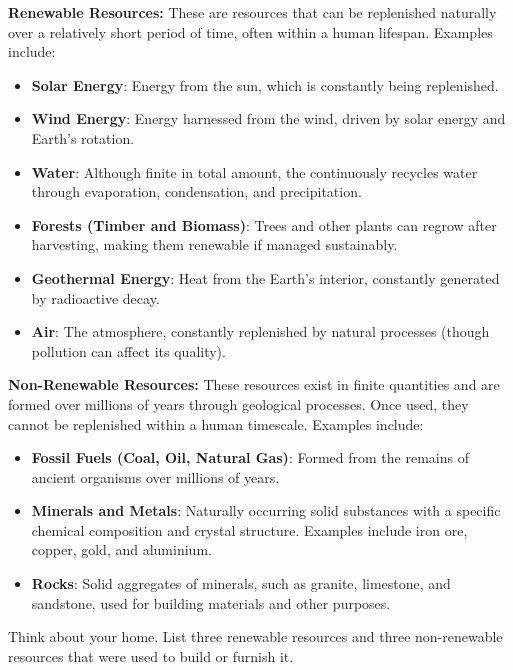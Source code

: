 \textbf{Renewable Resources:} These are resources that can be replenished naturally over a relatively short period of time, often within a human lifespan. Examples include:

\begin{itemize}
    \item \textbf{Solar Energy}:  Energy from the sun, which is constantly being replenished.
    \item \textbf{Wind Energy}:  Energy harnessed from the wind, driven by solar energy and Earth's rotation.
    \item \textbf{Water}:  Although finite in total amount, the  continuously recycles water through evaporation, condensation, and precipitation.
    \item \textbf{Forests (Timber and Biomass)}: Trees and other plants can regrow after harvesting, making them renewable if managed sustainably.
    \item \textbf{Geothermal Energy}: Heat from the Earth's interior, constantly generated by radioactive decay.
    \item \textbf{Air}: The atmosphere, constantly replenished by natural processes (though pollution can affect its quality).
\end{itemize}

\textbf{Non-Renewable Resources:} These resources exist in finite quantities and are formed over millions of years through geological processes. Once used, they cannot be replenished within a human timescale. Examples include:

\begin{itemize}
    \item \textbf{Fossil Fuels (Coal, Oil, Natural Gas)}: Formed from the remains of ancient organisms over millions of years.
    \item \textbf{Minerals and Metals}:  Naturally occurring solid substances with a specific chemical composition and crystal structure. Examples include iron ore, copper, gold, and aluminium.
    \item \textbf{Rocks}: Solid aggregates of minerals, such as granite, limestone, and sandstone, used for building materials and other purposes.
\end{itemize}

\begin{stopandthink}
Think about your home. List three renewable resources and three non-renewable resources that were used to build or furnish it.
\end{stopandthink}

